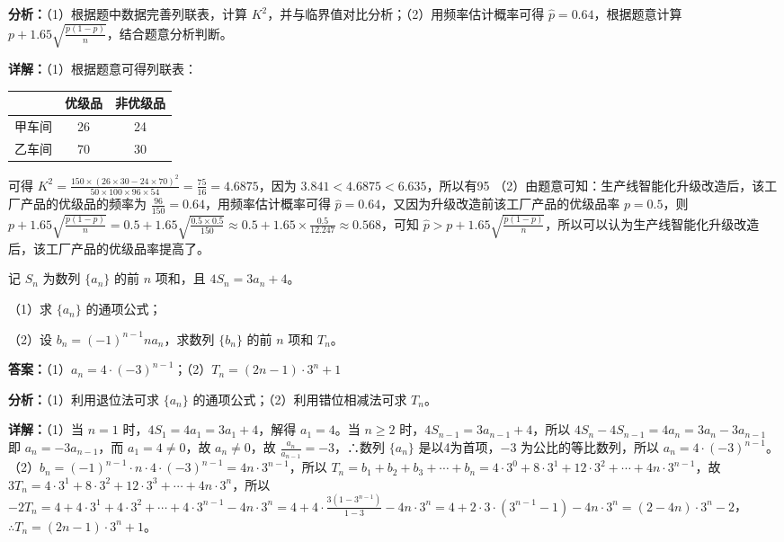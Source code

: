 \begin{question}[points=12]
\begin{solution}
\textbf{分析：}（1）根据题中数据完善列联表，计算 $K^2$，并与临界值对比分析；（2）用频率估计概率可得 $\hat{p}=0.64$，根据题意计算 $p+1.65\sqrt{\frac{p(1-p)}{n}}$，结合题意分析判断。

\textbf{详解：}（1）根据题意可得列联表：
\begin{tabular}{c|c|c}
& 优级品 & 非优级品 \\
\hline
甲车间 & 26 & 24 \\
乙车间 & 70 & 30 \\
\end{tabular}
可得 $K^2=\frac{150\times(26\times30-24\times70)^2}{50\times100\times96\times54}=\frac{75}{16}=4.6875$，因为 $3.841<4.6875<6.635$，所以有95%
（2）由题意可知：生产线智能化升级改造后，该工厂产品的优级品的频率为 $\frac{96}{150}=0.64$，用频率估计概率可得 $\hat{p}=0.64$，又因为升级改造前该工厂产品的优级品率 $p=0.5$，则 $p+1.65\sqrt{\frac{p(1-p)}{n}}=0.5+1.65\sqrt{\frac{0.5\times0.5}{150}}\approx0.5+1.65\times\frac{0.5}{12.247}\approx0.568$，可知 $\hat{p}>p+1.65\sqrt{\frac{p(1-p)}{n}}$，所以可以认为生产线智能化升级改造后，该工厂产品的优级品率提高了。
\end{solution}
\end{question}

\begin{question}[points=12]
记 $S_n$ 为数列 $\{a_n\}$ 的前 $n$ 项和，且 $4S_n=3a_n+4$。

（1）求 $\{a_n\}$ 的通项公式；

（2）设 $b_n=(-1)^{n-1}na_n$，求数列 $\{b_n\}$ 的前 $n$ 项和 $T_n$。
\begin{solution}
\textbf{答案：}（1）$a_n=4\cdot(-3)^{n-1}$；（2）$T_n=(2n-1)\cdot3^n+1$

\textbf{分析：}（1）利用退位法可求 $\{a_n\}$ 的通项公式；（2）利用错位相减法可求 $T_n$。

\textbf{详解：}（1）当 $n=1$ 时，$4S_1=4a_1=3a_1+4$，解得 $a_1=4$。当 $n\ge2$ 时，$4S_{n-1}=3a_{n-1}+4$，所以 $4S_n-4S_{n-1}=4a_n=3a_n-3a_{n-1}$ 即 $a_n=-3a_{n-1}$，而 $a_1=4\neq0$，故 $a_n\neq0$，故 $\frac{a_n}{a_{n-1}}=-3$，∴数列 $\{a_n\}$ 是以4为首项，$-3$ 为公比的等比数列，所以 $a_n=4\cdot(-3)^{n-1}$。
（2）$b_n=(-1)^{n-1}\cdot n\cdot4\cdot(-3)^{n-1}=4n\cdot3^{n-1}$，所以 $T_n=b_1+b_2+b_3+\cdots+b_n=4\cdot3^0+8\cdot3^1+12\cdot3^2+\cdots+4n\cdot3^{n-1}$，故 $3T_n=4\cdot3^1+8\cdot3^2+12\cdot3^3+\cdots+4n\cdot3^n$，所以 $-2T_n=4+4\cdot3^1+4\cdot3^2+\cdots+4\cdot3^{n-1}-4n\cdot3^n=4+4\cdot\frac{3(1-3^{n-1})}{1-3}-4n\cdot3^n=4+2\cdot3\cdot(3^{n-1}-1)-4n\cdot3^n=(2-4n)\cdot3^n-2$，$\therefore T_n=(2n-1)\cdot3^n+1$。
\end{solution}
\end{question}

